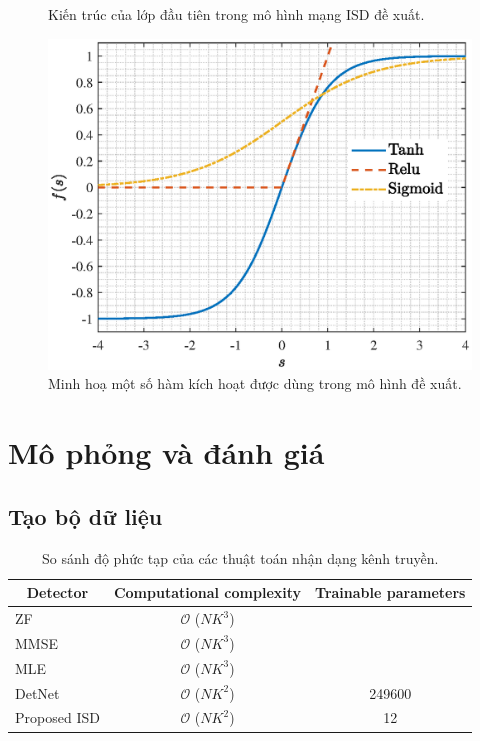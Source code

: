 \begin{figure}[ht]
    \caption{Kiến trúc của lớp đầu tiên trong mô hình mạng ISD đề xuất.}
    \label{fig:ISD}
\end{figure}

\begin{figure}[ht]
    \centering
    \includegraphics[width=.6\linewidth]{figures/tanh.eps}
    \caption{Minh hoạ một số hàm kích hoạt được dùng trong mô hình đề xuất.}
    \label{fig:tanh}
\end{figure}

\section{Mô phỏng và đánh giá}

\subsection{Tạo bộ dữ liệu}

\begin{table}[ht]
    \centering
    \caption{So sánh độ phức tạp của các thuật toán nhận dạng kênh truyền.}
    \label{tab:computational}
    \begin{tabular}{|l|c|c|}
    \hline
    \multicolumn{1}{|c|}{Detector} & Computational complexity & Trainable parameters \\ \hline
    ZF & $\mathcal{O}$ ($NK^3$) &  \\ \hline
    MMSE & $\mathcal{O}$ ($NK^3$) &  \\ \hline
    MLE & $\mathcal{O}$ ($NK^3$) &  \\ \hline
    DetNet~\cite{Samuel2019} & $\mathcal{O}$ ($NK^2$) & 249600 \\ \hline
    Proposed ISD & $\mathcal{O}$ ($NK^2$) & 12 \\ \hline
    \end{tabular}
\end{table}


